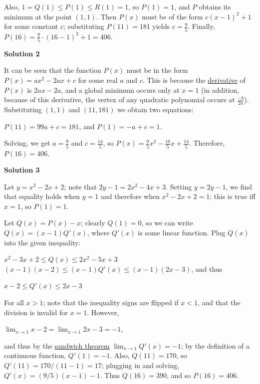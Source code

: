 \begin{enumerate}
 Also, $1 = Q(1) \le P(1) \le R(1) = 1$, so $P(1) = 1$, and $P$ obtains its minimum at the point $(1,1)$. Then $P(x)$ must be of the form $c(x-1)^2 + 1$ for some constant $c$; substituting $P(11) = 181$ yields $c = \frac 95$. Finally, $P(16) = \frac 95 \cdot (16 - 1)^2 + 1 = \boxed{406}$.

 



\textbf{Solution 2}

It can be seen that the function $P(x)$ must be in the form $P(x) = ax^2 - 2ax + c$ for some real $a$ and $c$. This is because the \href{https://artofproblemsolving.com/wiki/index.php?title=Derivative}{derivative} of $P(x)$ is $2ax - 2a$, and a global minimum occurs only at $x = 1$ (in addition, because of this derivative, the vertex of any quadratic polynomial occurs at $\frac{-b}{2a}$). Substituting $(1,1)$ and $(11, 181)$ we obtain two equations:

 $P(11) = 99a + c = 181$, and $P(1) = -a + c = 1$.

 Solving, we get $a = \frac{9}{5}$ and $c = \frac{14}{5}$, so $P(x) = \frac{9}{5}x^2 - \frac{18}{5}x + \frac {14}{5}$. Therefore, $P(16) = \boxed{406}$.

 



\textbf{Solution 3}

Let $y = x^2 - 2x + 2$; note that $2y - 1 = 2x^2 - 4x + 3$. Setting $y = 2y - 1$, we find that equality holds when $y = 1$ and therefore when $x^2 - 2x + 2 = 1$; this is true iff $x = 1$, so $P(1) = 1$.

 Let $Q(x) = P(x) - x$; clearly $Q(1) = 0$, so we can write $Q(x) = (x - 1)Q'(x)$, where $Q'(x)$ is some linear function. Plug $Q(x)$ into the given inequality:

 $x^2 - 3x + 2 \le Q(x) \le 2x^2 - 5x + 3$
$(x - 1)(x - 2) \le (x - 1)Q'(x) \le (x - 1)(2x - 3)$, and thus

 $x - 2 \le Q'(x) \le 2x - 3$

 For all $x > 1$; note that the inequality signs are flipped if $x < 1$, and that the division is invalid for $x = 1$. However,

 $\lim_{x \to 1}  x - 2 = \lim_{x \to 1}  2x - 3 = -1$,

 and thus by the \href{https://artofproblemsolving.com/wiki/index.php?title=Sandwich\_theorem}{sandwich theorem} $\lim_{x \to 1} Q'(x) = -1$; by the definition of a continuous function, $Q'(1) = -1$. Also, $Q(11) = 170$, so $Q'(11) = 170/(11-1) = 17$; plugging in and solving, $Q'(x) = (9/5)(x - 1) - 1$. Thus $Q(16) = 390$, and so $P(16) = \boxed{406}$.


\end{enumerate}
